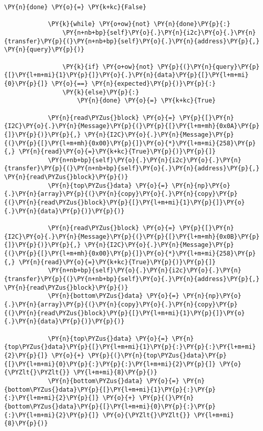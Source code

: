 \begin{tcolorbox}[breakable, size=fbox, boxrule=1pt, pad at break*=1mm,colback=cellbackground, colframe=cellborder]
\begin{Verbatim}[commandchars=\\\{\}]
			\PY{n}{done} \PY{o}{=} \PY{k+kc}{False}

			\PY{k}{while} \PY{o+ow}{not} \PY{n}{done}\PY{p}{:}
				\PY{n+nb+bp}{self}\PY{o}{.}\PY{n}{i2c}\PY{o}{.}\PY{n}{transfer}\PY{p}{(}\PY{n+nb+bp}{self}\PY{o}{.}\PY{n}{address}\PY{p}{,} \PY{n}{query}\PY{p}{)}

				\PY{k}{if} \PY{o+ow}{not} \PY{p}{(}\PY{n}{query}\PY{p}{[}\PY{l+m+mi}{1}\PY{p}{]}\PY{o}{.}\PY{n}{data}\PY{p}{[}\PY{l+m+mi}{0}\PY{p}{]} \PY{o}{==} \PY{n}{expected}\PY{p}{)}\PY{p}{:}
				\PY{k}{else}\PY{p}{:}
					\PY{n}{done} \PY{o}{=} \PY{k+kc}{True}

			\PY{n}{read\PYZus{}block} \PY{o}{=} \PY{p}{[}\PY{n}{I2C}\PY{o}{.}\PY{n}{Message}\PY{p}{(}\PY{p}{[}\PY{l+m+mh}{0x0A}\PY{p}{]}\PY{p}{)}\PY{p}{,} \PY{n}{I2C}\PY{o}{.}\PY{n}{Message}\PY{p}{(}\PY{p}{[}\PY{l+m+mh}{0x00}\PY{p}{]}\PY{o}{*}\PY{l+m+mi}{258}\PY{p}{,} \PY{n}{read}\PY{o}{=}\PY{k+kc}{True}\PY{p}{)}\PY{p}{]}
			\PY{n+nb+bp}{self}\PY{o}{.}\PY{n}{i2c}\PY{o}{.}\PY{n}{transfer}\PY{p}{(}\PY{n+nb+bp}{self}\PY{o}{.}\PY{n}{address}\PY{p}{,} \PY{n}{read\PYZus{}block}\PY{p}{)}
			\PY{n}{top\PYZus{}data} \PY{o}{=} \PY{n}{np}\PY{o}{.}\PY{n}{array}\PY{p}{(}\PY{n}{copy}\PY{o}{.}\PY{n}{copy}\PY{p}{(}\PY{n}{read\PYZus{}block}\PY{p}{[}\PY{l+m+mi}{1}\PY{p}{]}\PY{o}{.}\PY{n}{data}\PY{p}{)}\PY{p}{)}

			\PY{n}{read\PYZus{}block} \PY{o}{=} \PY{p}{[}\PY{n}{I2C}\PY{o}{.}\PY{n}{Message}\PY{p}{(}\PY{p}{[}\PY{l+m+mh}{0x0B}\PY{p}{]}\PY{p}{)}\PY{p}{,} \PY{n}{I2C}\PY{o}{.}\PY{n}{Message}\PY{p}{(}\PY{p}{[}\PY{l+m+mh}{0x00}\PY{p}{]}\PY{o}{*}\PY{l+m+mi}{258}\PY{p}{,} \PY{n}{read}\PY{o}{=}\PY{k+kc}{True}\PY{p}{)}\PY{p}{]}
			\PY{n+nb+bp}{self}\PY{o}{.}\PY{n}{i2c}\PY{o}{.}\PY{n}{transfer}\PY{p}{(}\PY{n+nb+bp}{self}\PY{o}{.}\PY{n}{address}\PY{p}{,} \PY{n}{read\PYZus{}block}\PY{p}{)}
			\PY{n}{bottom\PYZus{}data} \PY{o}{=} \PY{n}{np}\PY{o}{.}\PY{n}{array}\PY{p}{(}\PY{n}{copy}\PY{o}{.}\PY{n}{copy}\PY{p}{(}\PY{n}{read\PYZus{}block}\PY{p}{[}\PY{l+m+mi}{1}\PY{p}{]}\PY{o}{.}\PY{n}{data}\PY{p}{)}\PY{p}{)}

			\PY{n}{top\PYZus{}data} \PY{o}{=} \PY{n}{top\PYZus{}data}\PY{p}{[}\PY{l+m+mi}{1}\PY{p}{:}\PY{p}{:}\PY{l+m+mi}{2}\PY{p}{]} \PY{o}{+} \PY{p}{(}\PY{n}{top\PYZus{}data}\PY{p}{[}\PY{l+m+mi}{0}\PY{p}{:}\PY{p}{:}\PY{l+m+mi}{2}\PY{p}{]} \PY{o}{\PYZlt{}\PYZlt{}} \PY{l+m+mi}{8}\PY{p}{)}
			\PY{n}{bottom\PYZus{}data} \PY{o}{=} \PY{n}{bottom\PYZus{}data}\PY{p}{[}\PY{l+m+mi}{1}\PY{p}{:}\PY{p}{:}\PY{l+m+mi}{2}\PY{p}{]} \PY{o}{+} \PY{p}{(}\PY{n}{bottom\PYZus{}data}\PY{p}{[}\PY{l+m+mi}{0}\PY{p}{:}\PY{p}{:}\PY{l+m+mi}{2}\PY{p}{]} \PY{o}{\PYZlt{}\PYZlt{}} \PY{l+m+mi}{8}\PY{p}{)}


\end{Verbatim}
\end{tcolorbox}
